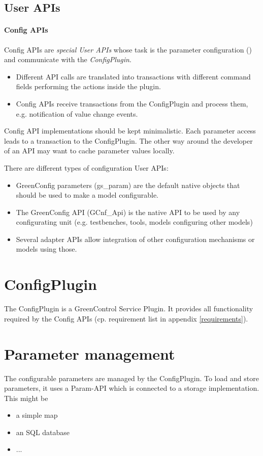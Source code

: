 \subsection{User APIs}

\paragraph{Config APIs}
Config APIs are \emph{special \GreenControl User APIs} whose task is the parameter configuration (\GreenConfig) and communicate with the \emph{ConfigPlugin}. 

\begin{itemize}
	\item Different API calls are translated into transactions with different command fields performing the actions inside the plugin.
	\item Config APIs receive transactions from the ConfigPlugin and process them, e.g. notification of value change events.
\end{itemize}

Config API implementations should be kept minimalistic. Each parameter access leads to a transaction to the ConfigPlugin. The other way around the developer of an API may want to cache parameter values locally.

There are different types of configuration User APIs:
\begin{itemize}
	\item GreenConfig parameters (gs\_param) are the default native objects that should be used to make a model configurable.
	\item The GreenConfig API (GCnf\_Api) is the native API to be used by any configurating unit (e.g. testbenches, tools, models configuring other models)
	\item Several adapter APIs allow integration of other configuration mechanisms or models using those.
\end{itemize}


\section{ConfigPlugin}
The ConfigPlugin is a GreenControl Service Plugin. It provides all functionality required by the Config APIs (cp. requirement list in appendix \ref{requirements}).


\section{Parameter management}
The configurable parameters are managed by the ConfigPlugin. To load and store parameters, it uses a Param-API which is connected to a storage implementation. This might be  

\begin{itemize}
	\item a simple map  
	\item an SQL database 
	\item ... 
\end{itemize}

